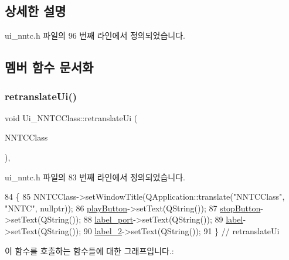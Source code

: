 \subsection{상세한 설명}


ui\+\_\+nntc.\+h 파일의 96 번째 라인에서 정의되었습니다.



\subsection{멤버 함수 문서화}
\mbox{\label{class_ui___n_n_t_c_class_ad2695a3333b66339fde691ec8384d154}} 
\subsubsection{\texorpdfstring{retranslate\+Ui()}{retranslateUi()}}
{\footnotesize\ttfamily void Ui\+\_\+\+N\+N\+T\+C\+Class\+::retranslate\+Ui (\begin{DoxyParamCaption}\item[{Q\+Dialog $\ast$}]{N\+N\+T\+C\+Class }\end{DoxyParamCaption})\hspace{0.3cm}{\ttfamily [inline]}, {\ttfamily [inherited]}}



ui\+\_\+nntc.\+h 파일의 83 번째 라인에서 정의되었습니다.


\begin{DoxyCode}
84     \{
85         NNTCClass->setWindowTitle(QApplication::translate(\textcolor{stringliteral}{"NNTCClass"}, \textcolor{stringliteral}{"NNTC"}, \textcolor{keyword}{nullptr}));
86         \mbox{\hyperlink{class_ui___n_n_t_c_class_a6e604f467f5d7264f8d23f0cf54a6fdf}{playButton}}->setText(QString());
87         \mbox{\hyperlink{class_ui___n_n_t_c_class_a748e190a62458531e66a574cc556e32d}{stopButton}}->setText(QString());
88         \mbox{\hyperlink{class_ui___n_n_t_c_class_a81085bd25c14084fdec83b6527ad7a4c}{label\_port}}->setText(QString());
89         \mbox{\hyperlink{class_ui___n_n_t_c_class_a4bb97de507bbb57b6d45f102b06a868f}{label}}->setText(QString());
90         \mbox{\hyperlink{class_ui___n_n_t_c_class_ae5ebb132466c86f325d6030871f57b5c}{label\_2}}->setText(QString());
91     \} \textcolor{comment}{// retranslateUi}
\end{DoxyCode}
이 함수를 호출하는 함수들에 대한 그래프입니다.\+:
\mbox{\label{class_ui___n_n_t_c_class_af15085afc5bdbefb529321782b509792}} 
